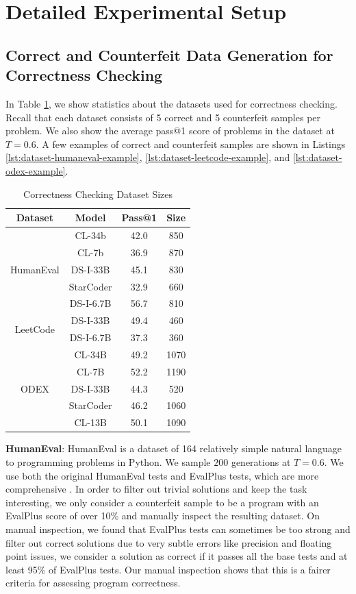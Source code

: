 
\section{Detailed Experimental Setup} \label{appendix:detailed-experimental-setup}
\subsection{Correct and Counterfeit Data Generation for Correctness Checking}
In Table \ref{tab:dataset-sizes-correctness-checking}, we show statistics about the datasets used for correctness checking. Recall that each dataset consists of 5 correct and 5 counterfeit samples per problem. We also show the average pass@1 score of problems in the dataset at $T=0.6$. A few examples of correct and counterfeit samples are shown in Listings \ref{lst:dataset-humaneval-example}, \ref{lst:dataset-leetcode-example}, and \ref{lst:dataset-odex-example}.

\begin{table}[H]
    \centering
    \caption{Correctness Checking Dataset Sizes}
    \begin{tabular}{cccc}
        \toprule
        \textbf{Dataset} & \textbf{Model} & \textbf{Pass@1} & \textbf{Size} \\
	\midrule
	\multirow{5}{*}{HumanEval}
	& CL-34b & 42.0 & 850 \\
	& CL-7b & 36.9 & 870 \\
	& DS-I-33B & 45.1 & 830 \\
	& StarCoder & 32.9 & 660 \\
	& DS-I-6.7B & 56.7 & 810 \\
        \midrule
	\multirow{2}{*}{LeetCode}
	& DS-I-33B & 49.4 & 460 \\
	& DS-I-6.7B & 37.3 & 360 \\
	\midrule
	\multirow{5}{*}{ODEX}
	& CL-34B & 49.2 & 1070 \\
	& CL-7B & 52.2 & 1190 \\
	& DS-I-33B & 44.3 & 520 \\
	& StarCoder & 46.2 & 1060 \\
	& CL-13B & 50.1 & 1090 \\
    \bottomrule
    \end{tabular}
    \label{tab:dataset-sizes-correctness-checking}
\end{table}

\textbf{HumanEval}: HumanEval \citep{chen2021evaluating} is a dataset of 164 relatively simple natural language to programming problems in Python. We sample $200$ generations at $T=0.6$. We use both the original HumanEval tests and EvalPlus tests, which are more comprehensive \citep{liu2023your}. In order to filter out trivial solutions and keep the task interesting, we only consider a counterfeit sample to be a program with an EvalPlus score of over 10\% and manually inspect the resulting dataset. On manual inspection, we found that EvalPlus tests can sometimes be too strong and filter out correct solutions due to very subtle errors like precision and floating point issues, we consider a solution as correct if it passes all the base tests and at least 95\% of EvalPlus tests. Our manual inspection shows that this is a fairer criteria for assessing program correctness.

